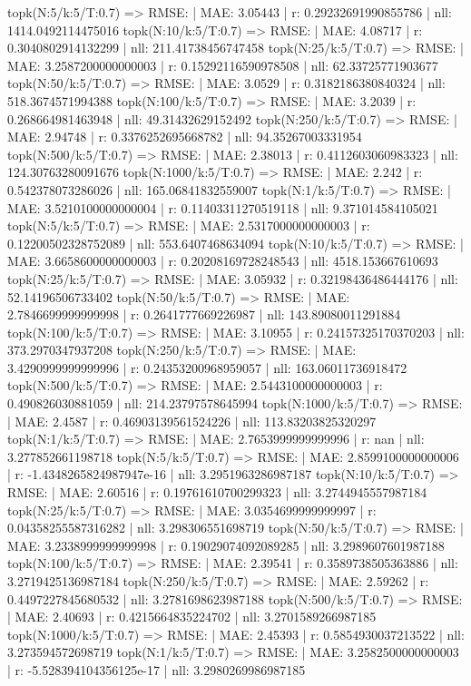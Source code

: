 topk(N:5/k:5/T:0.7) => RMSE: | MAE: 3.05443 | r: 0.29232691990855786 | nll: 1414.0492114475016
topk(N:10/k:5/T:0.7) => RMSE: | MAE: 4.08717 | r: 0.3040802914132299 | nll: 211.41738456747458
topk(N:25/k:5/T:0.7) => RMSE: | MAE: 3.2587200000000003 | r: 0.15292116590978508 | nll: 62.33725771903677
topk(N:50/k:5/T:0.7) => RMSE: | MAE: 3.0529 | r: 0.3182186380840324 | nll: 518.3674571994388
topk(N:100/k:5/T:0.7) => RMSE: | MAE: 3.2039 | r: 0.268664981463948 | nll: 49.31432629152492
topk(N:250/k:5/T:0.7) => RMSE: | MAE: 2.94748 | r: 0.3376252695668782 | nll: 94.35267003331954
topk(N:500/k:5/T:0.7) => RMSE: | MAE: 2.38013 | r: 0.4112603060983323 | nll: 124.30763280091676
topk(N:1000/k:5/T:0.7) => RMSE: | MAE: 2.242 | r: 0.542378073286026 | nll: 165.06841832559007
topk(N:1/k:5/T:0.7) => RMSE: | MAE: 3.5210100000000004 | r: 0.11403311270519118 | nll: 9.371014584105021
topk(N:5/k:5/T:0.7) => RMSE: | MAE: 2.5317000000000003 | r: 0.12200502328752089 | nll: 553.6407468634094
topk(N:10/k:5/T:0.7) => RMSE: | MAE: 3.6658600000000003 | r: 0.20208169728248543 | nll: 4518.153667610693
topk(N:25/k:5/T:0.7) => RMSE: | MAE: 3.05932 | r: 0.32198436486444176 | nll: 52.14196506733402
topk(N:50/k:5/T:0.7) => RMSE: | MAE: 2.7846699999999998 | r: 0.2641777669226987 | nll: 143.89080011291884
topk(N:100/k:5/T:0.7) => RMSE: | MAE: 3.10955 | r: 0.24157325170370203 | nll: 373.2970347937208
topk(N:250/k:5/T:0.7) => RMSE: | MAE: 3.4290999999999996 | r: 0.24353200968959057 | nll: 163.06011736918472
topk(N:500/k:5/T:0.7) => RMSE: | MAE: 2.5443100000000003 | r: 0.490826030881059 | nll: 214.23797578645994
topk(N:1000/k:5/T:0.7) => RMSE: | MAE: 2.4587 | r: 0.46903139561524226 | nll: 113.83203825320297
topk(N:1/k:5/T:0.7) => RMSE: | MAE: 2.7653999999999996 | r: nan | nll: 3.277852661198718
topk(N:5/k:5/T:0.7) => RMSE: | MAE: 2.8599100000000006 | r: -1.4348265824987947e-16 | nll: 3.2951963286987187
topk(N:10/k:5/T:0.7) => RMSE: | MAE: 2.60516 | r: 0.19761610700299323 | nll: 3.2744945557987184
topk(N:25/k:5/T:0.7) => RMSE: | MAE: 3.0354699999999997 | r: 0.04358255587316282 | nll: 3.298306551698719
topk(N:50/k:5/T:0.7) => RMSE: | MAE: 3.2338999999999998 | r: 0.19029074092089285 | nll: 3.2989607601987188
topk(N:100/k:5/T:0.7) => RMSE: | MAE: 2.39541 | r: 0.3589738505363886 | nll: 3.2719425136987184
topk(N:250/k:5/T:0.7) => RMSE: | MAE: 2.59262 | r: 0.4497227845680532 | nll: 3.2781698623987188
topk(N:500/k:5/T:0.7) => RMSE: | MAE: 2.40693 | r: 0.4215664835224702 | nll: 3.2701589266987185
topk(N:1000/k:5/T:0.7) => RMSE: | MAE: 2.45393 | r: 0.5854930037213522 | nll: 3.273594572698719
topk(N:1/k:5/T:0.7) => RMSE: | MAE: 3.2582500000000003 | r: -5.528394104356125e-17 | nll: 3.2980269986987185

